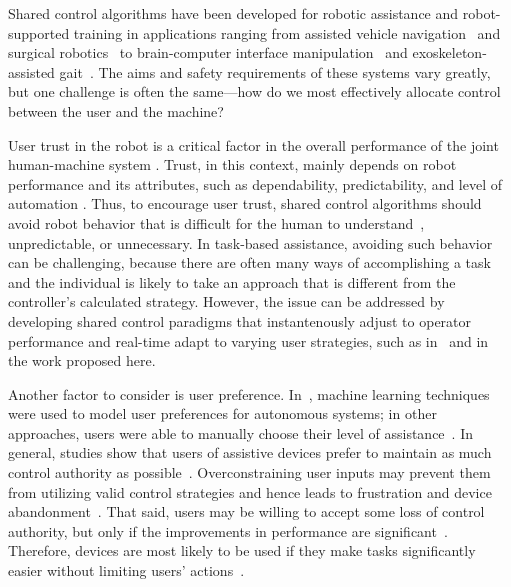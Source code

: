

Shared control algorithms have been developed for robotic assistance and robot-supported training in applications ranging from assisted vehicle navigation~\cite{autovehicle2014} and surgical robotics~\cite{surgeryrobot2004,RSS_surgery2014} to brain-computer interface manipulation~\cite{teleBCI2017} and exoskeleton-assisted gait~\cite{RSS_exo2013, exoMPC2011}. The aims and safety requirements of these systems vary greatly, but one challenge is often the same---how do we most effectively allocate control between the user and the machine? 

User trust in the robot is a critical factor in the overall performance of the joint human-machine system \cite{measurement_of_trust}. Trust, in this context, mainly depends on robot performance and its attributes, such as dependability, predictability, and level of automation \cite{trust_factors}. Thus, to encourage user trust, shared control algorithms should avoid robot behavior that is difficult for the human to understand~\cite{RSS_RoboObj2017}, unpredictable, or unnecessary. In task-based assistance, avoiding such behavior can be challenging, because there are often many ways of accomplishing a task and the individual is likely to take an approach that is different from the controller’s calculated strategy. However, the issue can be addressed by developing shared control paradigms that instantenously adjust to operator performance and real-time adapt to varying user strategies, such as in~\cite{RSS_shah_adaptive} and in the work proposed here.

Another factor to consider is user preference. In~\cite{RSS_userpref2017}, machine learning techniques were used to model user preferences for autonomous systems; in other approaches, users were able to manually choose their level of assistance~\cite{exoskeletons}. In general, studies show that users of assistive devices prefer to maintain as much control authority as possible~\cite{argall_keynote,RSS2011_assistedteleoperation,lankenau2001}. Overconstraining user inputs may prevent them from utilizing valid control strategies and hence leads to frustration and device abandonment~\cite{survey_deviceabandonment}. That said, users may be willing to accept some loss of control authority, but only if the improvements in performance are significant~\cite{RSS2011_assistedteleoperation, lankenau2001}. Therefore, devices are most likely to be used if they make tasks significantly easier without limiting users' actions~\cite{survey_deviceabandonment}. 

